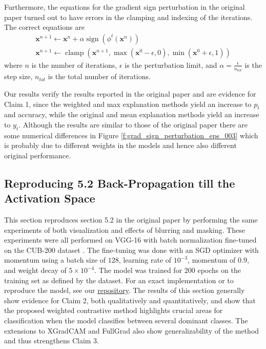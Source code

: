 Furthermore, the equations for the gradient sign perturbation in the original paper turned out to have errors in the clamping and indexing of the iterations. The correct equations are
\begin{gather}
    \pmb{x}^{n+1} \gets \pmb{x}^n + \alpha \operatorname{sign}(\phi^t(\pmb{x}^n)) \\
    \pmb{x}^{n+1} \gets \operatorname{clamp}(\pmb{x}^{n+1}, \max(\pmb{x}^0 - \epsilon, 0), \min(\pmb{x}^0 + \epsilon, 1))
\end{gather}
where $n$ is the number of iterations, $\epsilon$ is the perturbation limit, and
$\alpha = \frac{\epsilon}{n_{tot}}$ is the step size, ${n_{tot}}$ is the total number of iterations.

Our results verify the results reported in the original paper and are evidence for Claim 1, since the weighted and max explanation methods yield an increase to $p_t$ and accuracy, while the original and mean explanation methods yield an increase to $y_t$. Although the results are similar to those of the original paper there are some numerical differences in Figure \ref{f:grad_sign_perturbation_eps_003} which is probably due to different weights in the models and hence also different original performance.




\subsection{Reproducing 5.2 Back-Propagation till the Activation Space}
\label{gradcam_subsection}

This section reproduces section 5.2 in the original paper by performing the same experiments of both visualization and effects of blurring and masking. These experiments were all performed on VGG-16 with batch normalization \citep{vgg16} fine-tuned on the CUB-200 dataset \citep{cub200}. The fine-tuning was done with an SGD optimizer with momentum using a batch size of $128$, learning rate of $10^{-3}$, momentum of $0.9$, and weight decay of $5 \times 10^{-4}$. The model was trained for $200$ epochs on the training set as defined by the dataset. For an exact implementation or to reproduce the model, see our \href{https://anonymous.4open.science/r/contrastive-explanations-58EE/}{repository}. The results of this section generally show evidence for Claim 2, both qualitatively and quantitatively, and show that the proposed weighted contrastive method highlights crucial areas for classification when the model classifies between several dominant classes. The extensions to XGradCAM and FullGrad also show generalizability of the method and thus strengthens Claim 3.

